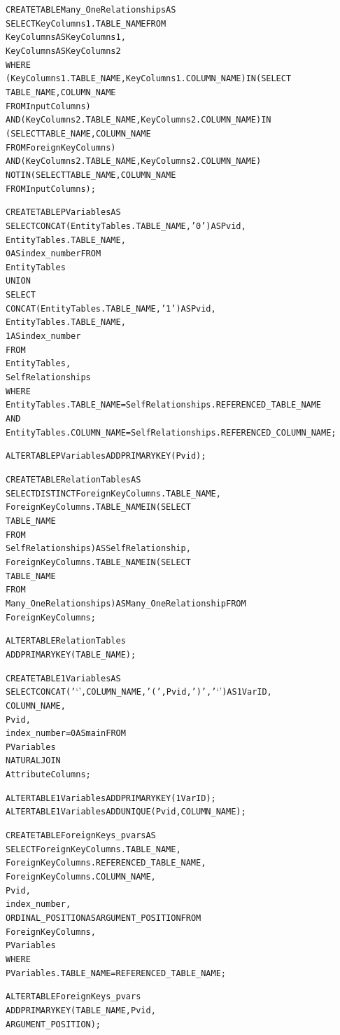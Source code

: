 \documentclass{IEEEtran}
\begin{document}
\begin{appendix}
\begin{scriptsize}
\begin{alltt}
CREATE TABLE Many_OneRelationships AS 
SELECT KeyColumns1.TABLE_NAME FROM
KeyColumns AS KeyColumns1,
KeyColumns AS KeyColumns2
WHERE
(KeyColumns1.TABLE_NAME , KeyColumns1.COLUMN_NAME) IN (SELECT 
        TABLE_NAME, COLUMN_NAME
    FROM         InputColumns)
    AND (KeyColumns2.TABLE_NAME , KeyColumns2.COLUMN_NAME) IN 
  (SELECT  TABLE_NAME, COLUMN_NAME
    FROM    ForeignKeyColumns)
    AND (KeyColumns2.TABLE_NAME , KeyColumns2.COLUMN_NAME)
   NOT IN (SELECT  TABLE_NAME, COLUMN_NAME
    FROM     InputColumns);

CREATE TABLE PVariables AS 
SELECT CONCAT(EntityTables.TABLE_NAME, '0') AS Pvid,
EntityTables.TABLE_NAME,
0 AS index_number FROM
EntityTables 
UNION 
SELECT 
CONCAT(EntityTables.TABLE_NAME, '1') AS Pvid,
EntityTables.TABLE_NAME,
1 AS index_number
FROM
EntityTables,
SelfRelationships
WHERE
EntityTables.TABLE_NAME = SelfRelationships.REFERENCED_TABLE_NAME
AND 
EntityTables.COLUMN_NAME = SelfRelationships.REFERENCED_COLUMN_NAME;

ALTER TABLE PVariables ADD PRIMARY KEY (Pvid);

CREATE TABLE RelationTables AS 
SELECT DISTINCT ForeignKeyColumns.TABLE_NAME,
ForeignKeyColumns.TABLE_NAME IN (SELECT 
        TABLE_NAME
    FROM
        SelfRelationships) AS SelfRelationship,
ForeignKeyColumns.TABLE_NAME IN (SELECT 
        TABLE_NAME
    FROM
        Many_OneRelationships) AS Many_OneRelationship FROM
ForeignKeyColumns;

ALTER TABLE RelationTables 
ADD PRIMARY KEY (TABLE_NAME);

CREATE TABLE 1Variables AS 
SELECT CONCAT('`', COLUMN_NAME, '(', Pvid, ')', '`') AS 1VarID,
COLUMN_NAME,
Pvid,
index_number = 0 AS main FROM
PVariables
    NATURAL JOIN
AttributeColumns;

ALTER TABLE 1Variables ADD PRIMARY KEY (1VarID);
ALTER TABLE 1Variables ADD UNIQUE(Pvid,COLUMN_NAME);

CREATE TABLE ForeignKeys_pvars AS 
SELECT ForeignKeyColumns.TABLE_NAME,
ForeignKeyColumns.REFERENCED_TABLE_NAME,
ForeignKeyColumns.COLUMN_NAME,
Pvid,
index_number,
ORDINAL_POSITION AS ARGUMENT_POSITION FROM
ForeignKeyColumns,
PVariables
WHERE
PVariables.TABLE_NAME = REFERENCED_TABLE_NAME;

ALTER TABLE ForeignKeys_pvars 
ADD PRIMARY KEY (TABLE_NAME,Pvid,
ARGUMENT_POSITION);


\end{alltt}
\end{scriptsize}
\end{appendix}
\end{document}
